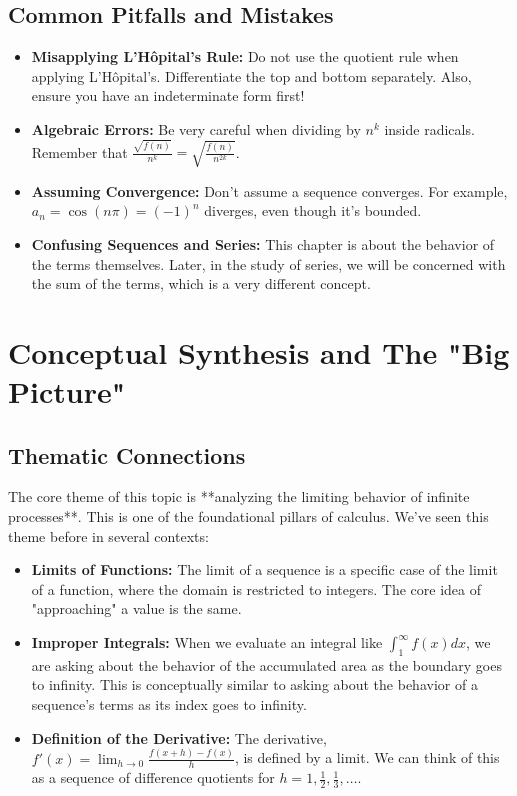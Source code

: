 \documentclass{article}
\begin{document}
\subsection{Common Pitfalls and Mistakes}
\begin{itemize}
    \item \textbf{Misapplying L'Hôpital's Rule:} Do not use the quotient rule when applying L'Hôpital's. Differentiate the top and bottom separately. Also, ensure you have an indeterminate form first!
    \item \textbf{Algebraic Errors:} Be very careful when dividing by $n^k$ inside radicals. Remember that $\frac{\sqrt{f(n)}}{n^k} = \sqrt{\frac{f(n)}{n^{2k}}}$.
    \item \textbf{Assuming Convergence:} Don't assume a sequence converges. For example, $a_n = \cos(n\pi) = (-1)^n$ diverges, even though it's bounded.
    \item \textbf{Confusing Sequences and Series:} This chapter is about the behavior of the terms themselves. Later, in the study of series, we will be concerned with the sum of the terms, which is a very different concept.
\end{itemize}

\section{Conceptual Synthesis and The "Big Picture"}

\subsection{Thematic Connections}
The core theme of this topic is **analyzing the limiting behavior of infinite processes**. This is one of the foundational pillars of calculus. We've seen this theme before in several contexts:
\begin{itemize}
    \item \textbf{Limits of Functions:} The limit of a sequence is a specific case of the limit of a function, where the domain is restricted to integers. The core idea of "approaching" a value is the same.
    \item \textbf{Improper Integrals:} When we evaluate an integral like $\int_1^\infty f(x) dx$, we are asking about the behavior of the accumulated area as the boundary goes to infinity. This is conceptually similar to asking about the behavior of a sequence's terms as its index goes to infinity.
    \item \textbf{Definition of the Derivative:} The derivative, $f'(x) = \lim_{h \to 0} \frac{f(x+h)-f(x)}{h}$, is defined by a limit. We can think of this as a sequence of difference quotients for $h = 1, \frac{1}{2}, \frac{1}{3}, \dots$.
\end{itemize}
\end{document}
